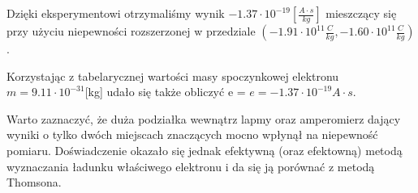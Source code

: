 \documentclass{article}
\begin{document}
Dzięki eksperymentowi otrzymaliśmy wynik $-1.37 \cdot 10^{-19} [\frac{A \cdot s}{kg}]$ mieszczący się przy użyciu niepewności rozszerzonej w przedziale $(-1.91 \cdot 10^{11} \frac{C}{kg}, -1.60 \cdot 10^{11} \frac{C}{kg})$. 

Korzystając z tabelarycznej wartości masy spoczynkowej elektronu $m = 9.11 \cdot 10^{-31} $[kg] udało się także obliczyć e = $e = -1.37 \cdot 10^{-19} A \cdot s$.

Warto zaznaczyć, że duża podziałka wewnątrz lapmy oraz amperomierz dający wyniki o tylko dwóch miejscach znaczących mocno wpłynął na niepewność pomiaru. Doświadczenie okazało się jednak efektywną (oraz efektowną) metodą wyznaczania ładunku właściwego elektronu i da się ją porównać z metodą Thomsona.





\end{document}
